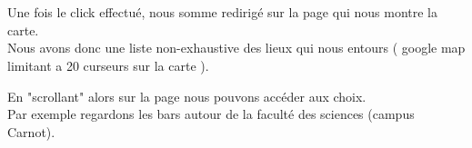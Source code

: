 \documentclass[10pt,a4paper, landscape]{report}
\begin{document}
{{\newpage
\section{}

Une fois le click effectué, nous somme redirigé sur la page qui nous montre la carte. \\
Nous avons donc une liste non-exhaustive des lieux qui nous entours ( google map limitant a 20 curseurs sur la carte ). \\
{%
\setlength{\fboxsep}{0pt}%
\setlength{\fboxrule}{2pt}%
%

\newpage
En "scrollant" alors sur la page nous pouvons accéder aux choix. \\
Par exemple regardons les bars autour de la faculté des sciences (campus Carnot). \\
{%
\setlength{\fboxsep}{0pt}%
\setlength{\fboxrule}{2pt}%
%

\newpage
\section{}

}}}}
\end{document}
